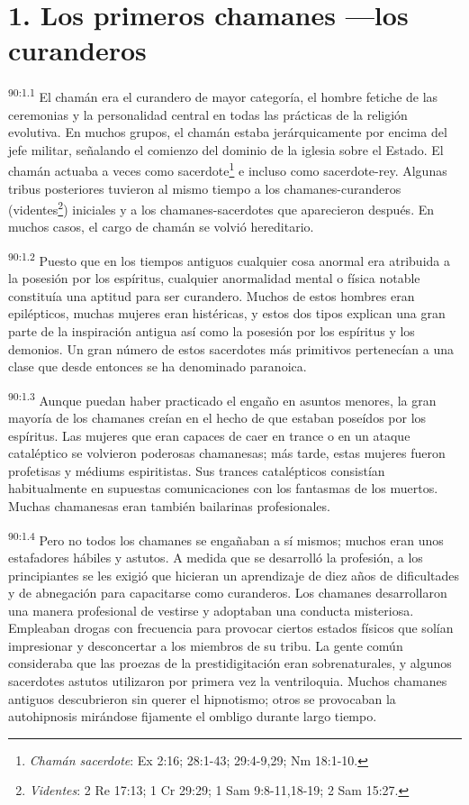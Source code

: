 \documentclass[twoside, 11pt]{book}
\begin{document}
\section*{1. Los primeros chamanes ---los curanderos}
\par
\textsuperscript{90:1.1} El chamán era el curandero de mayor categoría, el hombre fetiche de las ceremonias y la personalidad central en todas las prácticas de la religión evolutiva. En muchos grupos, el chamán estaba jerárquicamente por encima del jefe militar, señalando el comienzo del dominio de la iglesia sobre el Estado. El chamán actuaba a veces como sacerdote\footnote{\textit{Chamán sacerdote}: Ex 2:16; 28:1-43; 29:4-9,29; Nm 18:1-10.} e incluso como sacerdote-rey. Algunas tribus posteriores tuvieron al mismo tiempo a los chamanes-curanderos (videntes\footnote{\textit{Videntes}: 2 Re 17:13; 1 Cr 29:29; 1 Sam 9:8-11,18-19; 2 Sam 15:27.}) iniciales y a los chamanes-sacerdotes que aparecieron después. En muchos casos, el cargo de chamán se volvió hereditario.

\par
\textsuperscript{90:1.2} Puesto que en los tiempos antiguos cualquier cosa anormal era atribuida a la posesión por los espíritus, cualquier anormalidad mental o física notable constituía una aptitud para ser curandero. Muchos de estos hombres eran epilépticos, muchas mujeres eran histéricas, y estos dos tipos explican una gran parte de la inspiración antigua así como la posesión por los espíritus y los demonios. Un gran número de estos sacerdotes más primitivos pertenecían a una clase que desde entonces se ha denominado paranoica.

\par
\textsuperscript{90:1.3} Aunque puedan haber practicado el engaño en asuntos menores, la gran mayoría de los chamanes creían en el hecho de que estaban poseídos por los espíritus. Las mujeres que eran capaces de caer en trance o en un ataque cataléptico se volvieron poderosas chamanesas; más tarde, estas mujeres fueron profetisas y médiums espiritistas. Sus trances catalépticos consistían habitualmente en supuestas comunicaciones con los fantasmas de los muertos. Muchas chamanesas eran también bailarinas profesionales.

\par
\textsuperscript{90:1.4} Pero no todos los chamanes se engañaban a sí mismos; muchos eran unos estafadores hábiles y astutos. A medida que se desarrolló la profesión, a los principiantes se les exigió que hicieran un aprendizaje de diez años de dificultades y de abnegación para capacitarse como curanderos. Los chamanes desarrollaron una manera profesional de vestirse y adoptaban una conducta misteriosa. Empleaban drogas con frecuencia para provocar ciertos estados físicos que solían impresionar y desconcertar a los miembros de su tribu. La gente común consideraba que las proezas de la prestidigitación eran sobrenaturales, y algunos sacerdotes astutos utilizaron por primera vez la ventriloquia. Muchos chamanes antiguos descubrieron sin querer el hipnotismo; otros se provocaban la autohipnosis mirándose fijamente el ombligo durante largo tiempo.
\end{document}
